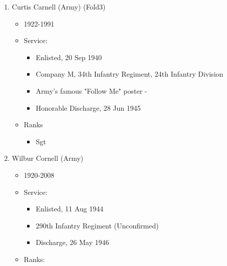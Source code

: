 \documentclass[11pt,letter]{book}
\begin{document}
\begin{enumerate}
\item Curtis Carnell (Army) (Fold3)
\begin{itemize}
\item 1922-1991
\item Service:
\begin{itemize}
\item Enlisted, 20 Sep 1940
\item Company M, 34th Infantry Regiment, 24th Infantry Division
\item Army's famous "Follow Me" poster -
\item Honorable Discharge, 28 Jun 1945
\end{itemize}
\item Ranks
\begin{itemize}
\item Sgt
\end{itemize}
\end{itemize}

\item Wilbur Cornell (Army)
\begin{itemize}
\item 1920-2008
\item Service:
\begin{itemize}
\item Enlisted, 11 Aug 1944
\item 290th Infantry Regiment (Unconfirmed)
\item Discharge, 26 May 1946
\end{itemize}
\item Ranks:
\end{itemize}


\end{enumerate}
\end{document}
